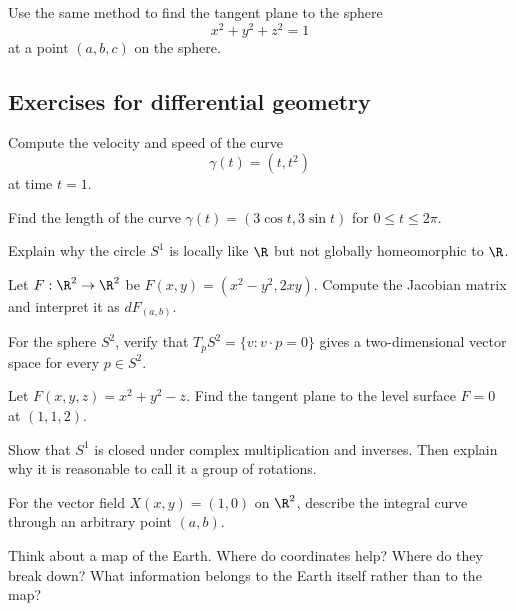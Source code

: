 \begin{labbox}
Use the same method to find the tangent plane to the sphere
\[
x^2+y^2+z^2=1
\]
at a point $(a,b,c)$ on the sphere.
\end{labbox}

\subsection{Exercises for differential geometry}

\begin{exercise}
Compute the velocity and speed of the curve
\[
\gamma(t)=(t,t^2)
\]
at time $t=1$.
\end{exercise}

\begin{exercise}
Find the length of the curve $\gamma(t)=(3\cos t,3\sin t)$ for
$0\leq t\leq 2\pi$.
\end{exercise}

\begin{exercise}
Explain why the circle $S^1$ is locally like $\R$ but not globally homeomorphic
to $\R$.
\end{exercise}

\begin{exercise}
Let $F:\R^2\to\R^2$ be $F(x,y)=(x^2-y^2,2xy)$. Compute the Jacobian matrix and
interpret it as $dF_{(a,b)}$.
\end{exercise}

\begin{exercise}
For the sphere $S^2$, verify that $T_pS^2=\{v:v\cdot p=0\}$ gives a
two-dimensional vector space for every $p\in S^2$.
\end{exercise}

\begin{exercise}
Let $F(x,y,z)=x^2+y^2-z$. Find the tangent plane to the level surface
$F=0$ at $(1,1,2)$.
\end{exercise}

\begin{exercise}
Show that $S^1$ is closed under complex multiplication and inverses. Then
explain why it is reasonable to call it a group of rotations.
\end{exercise}

\begin{exercise}
For the vector field $X(x,y)=(1,0)$ on $\R^2$, describe the integral curve
through an arbitrary point $(a,b)$.
\end{exercise}

\begin{walkbox}
Think about a map of the Earth. Where do coordinates help? Where do they break
down? What information belongs to the Earth itself rather than to the map?
\end{walkbox}

